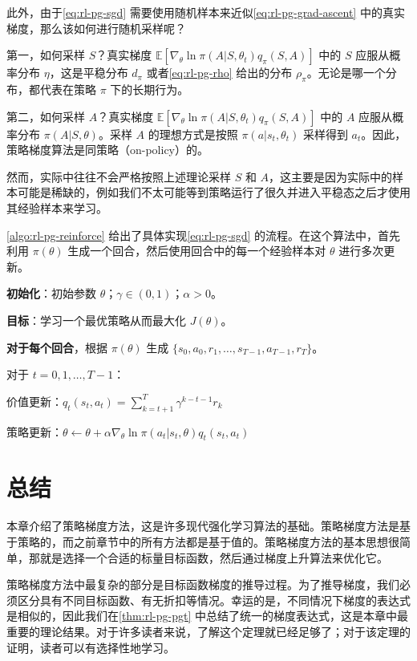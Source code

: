 此外，由于\cref{eq:rl-pg-sgd} 需要使用随机样本来近似\cref{eq:rl-pg-grad-ascent} 中的真实梯度，那么该如何进行随机采样呢？

第一，如何采样 $S$？真实梯度 $\mathbb{E}[\nabla_{\theta}\ln\pi(A|S,\theta_t)q_{\pi}(S,A)]$ 中的 $S$ 应服从概率分布 $\eta$，这是平稳分布 $d_{\pi}$ 或者\cref{eq:rl-pg-rho} 给出的分布 $\rho_{\pi}$。无论是哪一个分布，都代表在策略 $\pi$ 下的长期行为。

第二，如何采样 $A$？真实梯度 $\mathbb{E}[\nabla_{\theta}\ln\pi(A|S,\theta_t)q_{\pi}(S,A)]$ 中的 $A$ 应服从概率分布 $\pi(A|S,\theta)$。采样 $A$ 的理想方式是按照 $\pi(a|s_t,\theta_t)$ 采样得到 $a_t$。因此，策略梯度算法是同策略（on-policy）的。

然而，实际中往往不会严格按照上述理论采样 $S$ 和 $A$，这主要是因为实际中的样本可能是稀缺的，例如我们不太可能等到策略运行了很久并进入平稳态之后才使用其经验样本来学习。

\cref{algo:rl-pg-reinforce} 给出了具体实现\cref{eq:rl-pg-sgd} 的流程。在这个算法中，首先利用 $\pi(\theta)$ 生成一个回合，然后使用回合中的每一个经验样本对 $\theta$ 进行多次更新。

\begin{algo}
\label{algo:rl-pg-reinforce}
\textbf{初始化}：初始参数 $\theta$；$\gamma \in (0,1)$；$\alpha > 0$。

\textbf{目标}：学习一个最优策略从而最大化 $J(\theta)$。

\textbf{对于每个回合}，根据 $\pi(\theta)$ 生成 $\{s_0,a_0,r_1,\dots,s_{T-1},a_{T-1},r_T\}$。

\quad 对于 $t = 0,1,\ldots,T-1$：

\qquad 价值更新：$q_t(s_t,a_t) = \sum_{k=t+1}^{T}\gamma^{k-t-1}r_k$

\qquad 策略更新：$\theta \leftarrow \theta + \alpha \nabla_{\theta}\ln \pi(a_t|s_t,\theta)q_t(s_t,a_t)$
\end{algo}

\section{总结}
\label{sec:rl-pg-summary}

本章介绍了策略梯度方法，这是许多现代强化学习算法的基础。策略梯度方法是基于策略的，而之前章节中的所有方法都是基于值的。策略梯度方法的基本思想很简单，那就是选择一个合适的标量目标函数，然后通过梯度上升算法来优化它。

策略梯度方法中最复杂的部分是目标函数梯度的推导过程。为了推导梯度，我们必须区分具有不同目标函数、有无折扣等情况。幸运的是，不同情况下梯度的表达式是相似的，因此我们在\cref{thm:rl-pg-pgt} 中总结了统一的梯度表达式，这是本章中最重要的理论结果。对于许多读者来说，了解这个定理就已经足够了；对于该定理的证明，读者可以有选择性地学习。

